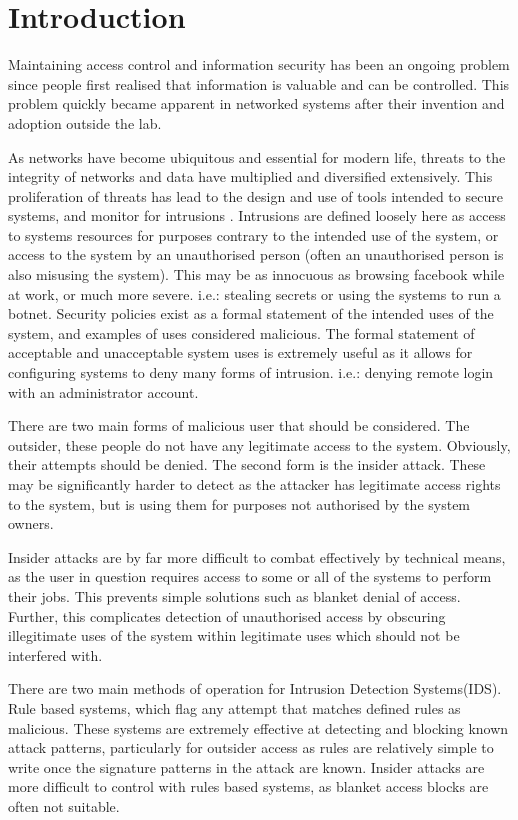\chapter{Introduction}\label{C:intro}

Maintaining access control and information security has been an ongoing problem since people first realised that information is valuable and can be controlled. This problem quickly became apparent in networked systems after their invention and adoption outside the lab.

As networks have become ubiquitous and essential for modern life, threats to the integrity of networks and data have multiplied and diversified extensively. 
This proliferation of threats has lead to the design and use of tools intended to secure systems, and monitor for intrusions \cite{zhang2012survey}. Intrusions are defined loosely here as access to systems resources for purposes contrary to the intended use of the system, or access to the system by an unauthorised person (often an unauthorised person is also misusing the system). This may be as innocuous as browsing facebook while at work, or much more severe. i.e.: stealing secrets or using the systems to run a botnet. Security policies exist as a formal statement of the intended uses of the system, and examples of uses considered malicious. The formal statement of acceptable and unacceptable system uses is extremely useful as it allows for configuring systems to deny many forms of intrusion. i.e.: denying remote login with an administrator account. 

There are two main forms of malicious user that should be considered. The outsider, these people do not have any legitimate access to the system. Obviously, their attempts should be denied. The second form is the insider attack. These may be significantly harder to detect as the attacker has legitimate access rights to the system, but is using them for purposes not authorised by the system owners.

Insider attacks are by far more difficult to combat effectively by technical means, as the user in question requires access to some or all of the systems to perform their jobs. This prevents simple solutions such as blanket denial of access. Further, this complicates detection of unauthorised access by obscuring illegitimate uses of the system within legitimate uses which should not be interfered with.

There are two main methods of operation for Intrusion Detection Systems(IDS).
Rule based systems, which flag any attempt that matches defined rules as malicious. These systems are extremely effective at detecting and blocking known attack patterns, particularly for outsider access as rules are relatively simple to write once the signature patterns in the attack are known. Insider attacks are more difficult to control with rules based systems, as blanket access blocks are often not suitable. 

